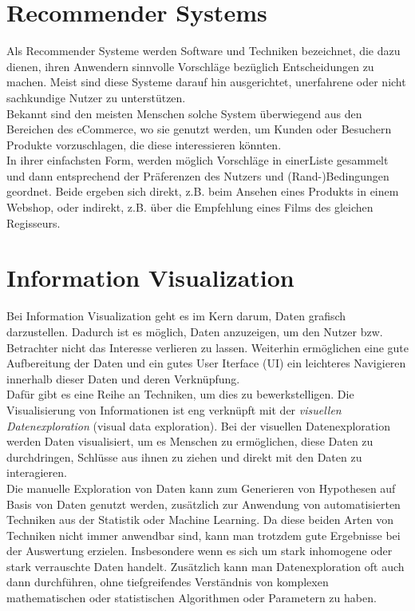 	\section{Recommender Systems}
	Als Recommender Systeme werden Software und Techniken bezeichnet, die dazu
	dienen, ihren Anwendern sinnvolle Vorschläge bezüglich Entscheidungen zu
	machen. Meist sind diese Systeme darauf hin ausgerichtet, unerfahrene oder
	nicht sachkundige Nutzer zu unterstützen. \cite{Fra10}\\
	Bekannt sind den meisten Menschen solche System überwiegend aus den Bereichen
	des eCommerce, wo sie genutzt werden, um Kunden oder Besuchern Produkte
	vorzuschlagen, die diese interessieren könnten.\\
	In ihrer einfachsten Form, werden möglich Vorschläge in einerListe gesammelt
	und dann entsprechend der Präferenzen des Nutzers und (Rand-)Bedingungen
	geordnet. Beide ergeben sich direkt, z.B. beim Ansehen eines Produkts in einem
	Webshop, oder indirekt, z.B. über die Empfehlung eines Films des gleichen
	Regisseurs.\cite{Fra10}
	
	\section{Information Visualization}
	Bei Information Visualization geht es im Kern darum, Daten grafisch
	darzustellen. Dadurch ist es möglich, Daten anzuzeigen, um den
	Nutzer bzw. Betrachter nicht das Interesse verlieren zu lassen. Weiterhin
	ermöglichen eine gute Aufbereitung der Daten und ein gutes User Iterface (UI)
	ein leichteres Navigieren innerhalb dieser Daten und deren Verknüpfung.\\
	Dafür gibt es eine Reihe an Techniken, um dies zu bewerkstelligen. Die
	Visualisierung von Informationen ist eng verknüpft mit der \textit{visuellen
	Datenexploration} (visual data exploration).
	Bei der visuellen Datenexploration werden Daten visualisiert, um es Menschen zu
	ermöglichen, diese Daten zu durchdringen, Schlüsse aus ihnen zu ziehen und
	direkt mit den Daten zu interagieren. \cite{Kei02}\\
	Die manuelle Exploration von Daten kann zum Generieren von Hypothesen auf Basis
	von Daten genutzt werden, zusätzlich zur Anwendung von automatisierten
	Techniken aus der Statistik oder Machine Learning. Da diese beiden Arten von
	Techniken nicht immer anwendbar sind, kann man trotzdem gute Ergebnisse bei der
	Auswertung erzielen. Insbesondere wenn es  sich um stark inhomogene oder stark
	verrauschte Daten handelt. Zusätzlich kann man Datenexploration oft auch dann
	durchführen, ohne tiefgreifendes Verständnis von komplexen  mathematischen oder
	statistischen Algorithmen oder Parametern zu haben.\cite{Kei02}
	
